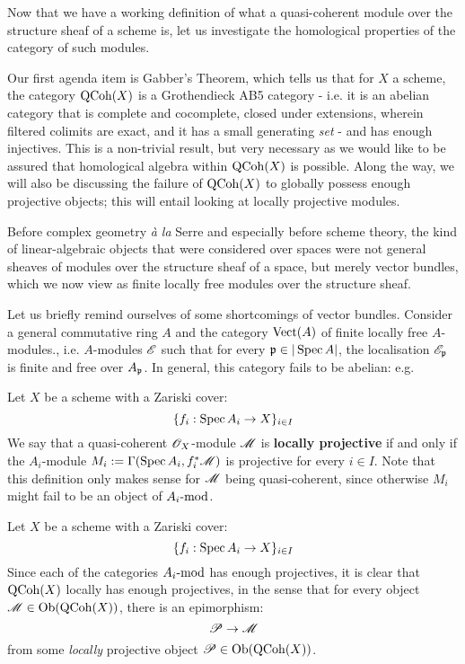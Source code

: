         Now that we have a working definition of what a quasi-coherent module over the structure sheaf of a scheme is, let us investigate the homological properties of the category of such modules. 

        Our first agenda item is Gabber's Theorem, which tells us that for $X$ a scheme, the category $\QCoh(X)$ is a Grothendieck AB5 category - i.e. it is an abelian category that is complete and cocomplete, closed under extensions, wherein filtered colimits are exact, and it has a small generating \textit{set} - and has enough injectives. This is a non-trivial result, but very necessary as we would like to be assured that homological algebra within $\QCoh(X)$ is possible. Along the way, we will also be discussing the failure of $\QCoh(X)$ to globally possess enough projective objects; this will entail looking at locally projective modules. 
        \begin{remark}
            Before complex geometry \textit{\`a la} Serre and especially before scheme theory, the kind of linear-algebraic objects that were considered over spaces were not general sheaves of modules over the structure sheaf of a space, but merely vector bundles, which we now view as finite locally free modules over the structure sheaf. 

            Let us briefly remind ourselves of some shortcomings of vector bundles. Consider a general commutative ring $A$ and the category $\Vect(A)$ of finite locally free $A$-modules., i.e. $A$-modules $\scrE$ such that for every $\p \in |\Spec A|$, the localisation $\scrE_{\p}$ is finite and free over $A_{\p}$. In general, this category fails to be abelian: e.g. 
        \end{remark}

        \begin{definition} \label{def: locally_projective_modules}
            Let $X$ be a scheme with a Zariski cover:
                $$\{f_i: \Spec A_i \to X\}_{i \in I}$$
            We say that a quasi-coherent $\scrO_X$-module $\scrM$ is \textbf{locally projective} if and only if the $A_i$-module $M_i := \Gamma(\Spec A_i, f_i^*\scrM)$ is projective for every $i \in I$. Note that this definition only makes sense for $\scrM$ being quasi-coherent, since otherwise $M_i$ might fail to be an object of $A_i\mod$.
        \end{definition}
        \begin{remark}
            Let $X$ be a scheme with a Zariski cover:
                $$\{f_i: \Spec A_i \to X\}_{i \in I}$$
            Since each of the categories $A_i\mod$ has enough projectives, it is clear that $\QCoh(X)$ locally has enough projectives, in the sense that for every object $\scrM \in \Ob( \QCoh(X) )$, there is an epimorphism:
                $$\scrP \to \scrM$$
            from some \textit{locally} projective object $\scrP \in \Ob( \QCoh(X) )$. 
        \end{remark}
        
